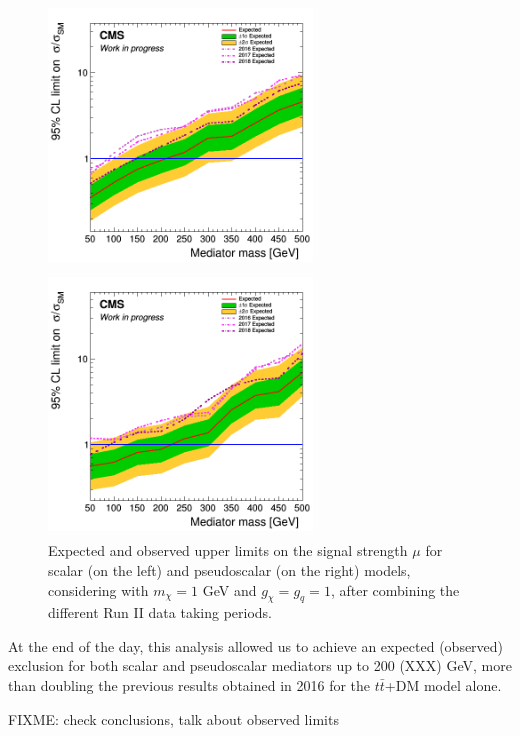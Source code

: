\documentclass[a4paper, 10pt, openright]{report}
\begin{document}
\begin{figure}[htbp]
\centering
\begin{minipage}[b]{.49\textwidth}
\includegraphics[width=7cm, height=7cm]{figs/limit_scalar.png}
\end{minipage}\hfill
\begin{minipage}[b]{.49\textwidth}
\includegraphics[width=7cm, height=7cm]{figs/limit_pseudo.png}
\end{minipage} \hfill
\caption{Expected and observed upper limits on the signal strength $\mu$ for scalar (on the left) and pseudoscalar (on the right) models, considering with $m_\chi = 1$ GeV and $g_\chi = g_q = 1$, after combining the different Run II data taking periods.}
\label{fig:limitsPerYear}
\end{figure}

At the end of the day, this analysis allowed us to achieve an expected (observed) exclusion for both scalar and pseudoscalar mediators up to 200 (XXX) GeV, more than doubling the previous results obtained in 2016 for the $t \bar t$+DM model alone.

\color{red} FIXME: check conclusions, talk about observed limits \color{black}
\end{document}
